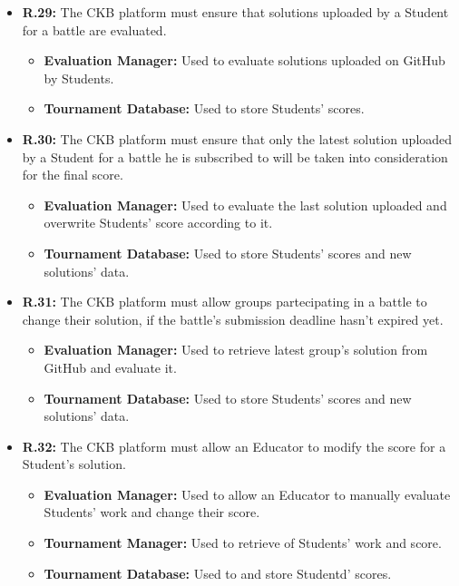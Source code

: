 \documentclass{article}
\begin{document}
{\begin{itemize}
\begin{itemize}
          \end{itemize}
    \item \textbf{R.29:} The CKB platform must ensure that solutions uploaded by a Student for a battle are evaluated.
          \begin{itemize}
              \item \textbf{Evaluation Manager:} Used to evaluate solutions uploaded on GitHub by Students.
              \item \textbf{Tournament Database:} Used to store Students' scores.
          \end{itemize}
    \item \textbf{R.30:} The CKB platform must ensure that only the latest solution uploaded by a Student for a battle he is subscribed to will
          be taken into consideration for the final score.
          \begin{itemize}
              \item \textbf{Evaluation Manager:} Used to evaluate the last solution uploaded and
              overwrite Students' score according to it.
              \item \textbf{Tournament Database:} Used to store Students' scores and new solutions' data.
          \end{itemize}
    \item \textbf{R.31:} The CKB platform must allow groups partecipating in a battle to change their solution,
          if the battle's submission deadline hasn't expired yet.
          \begin{itemize}
            \item \textbf{Evaluation Manager:} Used to retrieve latest group's solution from GitHub and evaluate it.
              \item \textbf{Tournament Database:} Used to store Students' scores and new solutions' data.
          \end{itemize}
    \item \textbf{R.32:} The CKB platform must allow an Educator to modify the score for a Student's solution.
          \begin{itemize}
              \item \textbf{Evaluation Manager:} Used to allow an Educator to manually evaluate Students'
              work and change their score.
              \item \textbf{Tournament Manager:} Used to retrieve of Students' work and score.
              \item \textbf{Tournament Database:} Used to and store Studentd' scores.

\end{itemize}
\end{itemize}}
\end{document}
